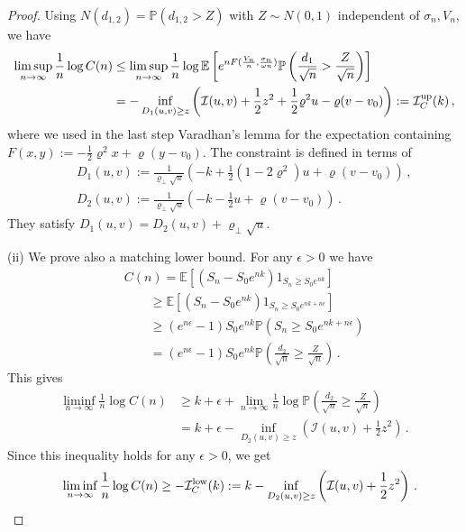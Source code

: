 \documentclass[11pt]{article}
\numberwithin{equation}{section}
\theoremstyle{plain}
\begin{document}
\begin{proof}
Using $N(d_{1,2} ) = \mathbb{P}(d_{1,2} > Z)$ with $Z\sim N(0,1)$ independent
of $\sigma_n,V_n$, we have 
\begin{align}\label{ICup}
\limsup_{n\to \infty} \frac{1}{n} \log C(n) 
&\leq
\limsup_{n\to \infty} \frac{1}{n} \log 
\mathbb{E}\left[e^{nF(\frac{V_n}{n},\frac{\sigma_n}{\omega n})}
\mathbb{P}\left(\frac{d_1}{\sqrt{n}} > \frac{Z}{\sqrt{n}}\right)\right] \\
&=
- \inf_{D_1(u,v) \geq z } 
\left( \mathcal{I}(u,v) + \frac12 z^2 + \frac12\varrho^2 u - \varrho (v-v_0)\right) 
:= \mathcal{I}_C^{\rm up}(k)\,, \nonumber
\end{align}
where we used in the last step Varadhan's lemma for the expectation
containing $F(x,y) := -\frac12\varrho^2 x + \varrho (y-v_0)$. The constraint
is defined in terms of
\begin{eqnarray}\label{D1def}
&& D_1(u,v) := \frac{1}{\varrho_\perp \sqrt{u}}\left(
- k + \frac12 (1 - 2\varrho^2) u + \varrho(v - v_0) \right)\,, \\
\label{D2def}
&& D_2(u,v) := \frac{1}{\varrho_\perp \sqrt{u}}\left(
- k - \frac12 u + \varrho(v - v_0) \right) \,.
\end{eqnarray}
They satisfy $D_1(u,v) = D_2(u,v) + \varrho_\perp \sqrt{u}$.

(ii) We prove also a matching lower bound. For any $\epsilon > 0$ we have
\begin{eqnarray}
&& C(n) = \mathbb{E}\left[\left(S_n - S_0 e^{nk}\right) 1_{S_n \geq S_0 e^{nk}}\right] \\
&& \qquad \geq \mathbb{E}\left[\left(S_n - S_0 e^{nk}\right) 1_{S_n \geq S_0 e^{nk+n \epsilon}}\right] \nonumber \\
&& \qquad \geq (e^{n\epsilon} - 1) S_0 e^{nk} \mathbb{P}\left(S_n \geq S_0 e^{nk + n\epsilon}\right)\nonumber \\
&& \qquad = (e^{n\epsilon} - 1) S_0 e^{nk} 
\mathbb{P}\left( \frac{d_2}{\sqrt{n}} \geq \frac{Z}{\sqrt{n}}\right)\,.\nonumber
\end{eqnarray}
This gives
\begin{align}
\liminf_{n\to \infty} \frac{1}{n} \log C(n) 
&\geq
k + \epsilon + \lim_{n\to \infty} \frac{1}{n} \log 
\mathbb{P}\left(\frac{d_2}{\sqrt{n}} \geq \frac{Z}{\sqrt{n}}\right) 
\\
&= k + \epsilon - \inf_{D_2(u,v) \geq z } 
\left( \mathcal{I}(u,v) + \frac12 z^2 \right) \,.\nonumber
\end{align}
Since this inequality holds for any $\epsilon >0$, we get
\begin{eqnarray}\label{IClow}
&& \liminf_{n\to \infty} \frac{1}{n} \log C(n)  \geq - \mathcal{I}_C^{\rm low}(k)
:= k - \inf_{D_2(u,v) \geq z } 
\left( \mathcal{I}(u,v) + \frac12 z^2 \right) \,.
\end{eqnarray}


\end{proof}
\end{document}
